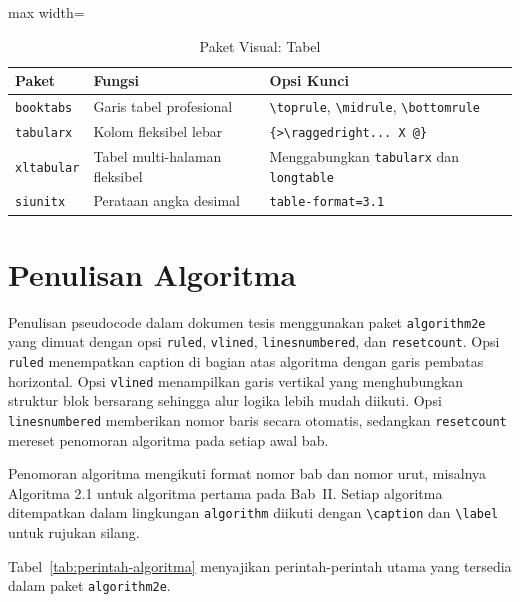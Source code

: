 \begin{table}[h]
  \centering
  \caption{Paket Visual: Tabel}
  \label{tab:paket-visual-tabel}
  \begin{adjustbox}{max width=\textwidth}
  \begin{tabular}{lll}
    \toprule
    \textbf{Paket} & \textbf{Fungsi} & \textbf{Opsi Kunci} \\
    \midrule
    \texttt{booktabs} & Garis tabel profesional & \texttt{\textbackslash toprule}, \texttt{\textbackslash midrule}, \texttt{\textbackslash bottomrule} \\
    \texttt{tabularx} & Kolom fleksibel lebar & \texttt{\{>\textbackslash raggedright... X @{\}}} \\
    \texttt{xltabular} & Tabel multi-halaman fleksibel & Menggabungkan \texttt{tabularx} dan \texttt{longtable} \\
    \texttt{siunitx} & Perataan angka desimal & \texttt{table-format=3.1} \\
    \bottomrule
  \end{tabular}
  \end{adjustbox}
\end{table}

\section{Penulisan Algoritma}

Penulisan pseudocode dalam dokumen tesis menggunakan paket \texttt{algorithm2e} yang dimuat dengan opsi \texttt{ruled}, \texttt{vlined}, \texttt{linesnumbered}, dan \texttt{resetcount}. Opsi \texttt{ruled} menempatkan caption di bagian atas algoritma dengan garis pembatas horizontal. Opsi \texttt{vlined} menampilkan garis vertikal yang menghubungkan struktur blok bersarang sehingga alur logika lebih mudah diikuti. Opsi \texttt{linesnumbered} memberikan nomor baris secara otomatis, sedangkan \texttt{resetcount} mereset penomoran algoritma pada setiap awal bab.

Penomoran algoritma mengikuti format nomor bab dan nomor urut, misalnya Algoritma 2.1 untuk algoritma pertama pada Bab~II. Setiap algoritma ditempatkan dalam lingkungan \texttt{algorithm} diikuti dengan \texttt{\textbackslash caption} dan \texttt{\textbackslash label} untuk rujukan silang.

Tabel~\ref{tab:perintah-algoritma} menyajikan perintah-perintah utama yang tersedia dalam paket \texttt{algorithm2e}.

